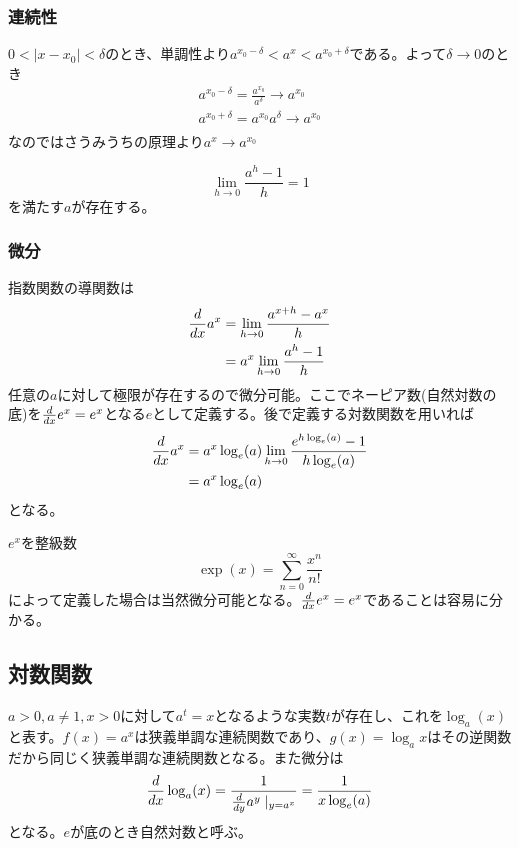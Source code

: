 	\subsubsection{連続性}
		$0 < |x - x_0| < \delta$のとき、単調性より$a^{x_0 - \delta} < a^x < a^{x_0 + \delta}$である。よって$\delta \to 0$のとき
		\begin{gather*}
			a^{x_0 - \delta} = \frac{a^{x_0}}{a^\delta} \to a^{x_0}\\
			a^{x_0 + \delta} = a^{x_0}a^\delta \to a^{x_0}\\
		\end{gather*}
		なのではさうみうちの原理より$a^x \to a^{x_0}$

		\begin{prop}
				\[\lim_{h \to 0} \frac{a^h - 1}{h} = 1\]
			を満たす$a$が存在する。
		\end{prop}

	\subsubsection{微分}
		指数関数の導関数は
		\begin{align*}
			\frac{d }{d x}a^x
			&= \lim_{h \to 0} \frac{a^{x + h} - a^x}{h}\\
			&= a^x\lim_{h \to 0} \frac{a^h - 1}{h}\\
		\end{align*}
		任意の$a$に対して極限が存在するので微分可能。ここでネーピア数(自然対数の底)を$\frac{d }{d x}e^x = e^x$となる$e$として定義する。後で定義する対数関数を用いれば
		\begin{align*}
			\frac{d }{d x}a^x
			&= a^x\log_e(a)\lim_{h \to 0} \frac{e^{h\log_e(a)} - 1}{h\log_e(a)}\\
			&= a^x\log_e(a)\\
		\end{align*}
		となる。

		$e^x$を整級数
			\[\exp(x) = \sum_{n = 0}^\infty \frac{x^n}{n!}\]
		によって定義した場合は当然微分可能となる。$\frac{d }{d x}e^x = e^x$であることは容易に分かる。

\subsection{対数関数}
	$a > 0, a \neq 1, x > 0$に対して$a^t = x$となるような実数$t$が存在し、これを$\log_a(x)$と表す。$f(x) = a^x$は狭義単調な連続関数であり、$g(x) = \log_a x$はその逆関数だから同じく狭義単調な連続関数となる。また微分は
		\[\frac{d }{d x}\log_a(x) = \frac{1}{\frac{d }{d y}a^y \mid_{y = a^x}} = \frac{1}{x\log_e(a)}\]
	となる。$e$が底のとき自然対数と呼ぶ。

